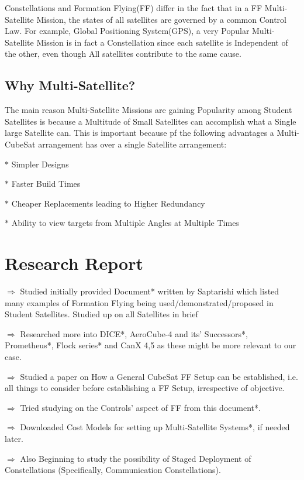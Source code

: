 \documentclass[12pt, a4paper, oneside]{book}
\newenvironment{section-points}{\begin{adjustwidth}{2cm}{2cm}}{\end{adjustwidth}}
\newenvironment{main-points}{\begin{adjustwidth}{1cm}{1cm}}{\end{adjustwidth}}
\begin{document}
\vspace{0.3cm}

Constellations and Formation Flying(FF) differ in the fact that in a FF Multi-Satellite Mission, the states of all satellites are governed by a common Control Law. For example, Global Positioning System(GPS), a very Popular Multi-Satellite Mission is in fact a Constellation since each satellite is Independent of the other, even  though All satellites contribute to the same cause.

\section{Why Multi-Satellite?}

The main reason Multi-Satellite Missions are gaining Popularity among Student Satellites is because a Multitude of Small Satellites can accomplish what a Single large Satellite can. This is important because pf the following advantages a Multi-CubeSat arrangement has over a single Satellite arrangement:
\vspace{-0.5cm}
\begin{section-points}
	\item[$\ast$] Simpler Designs
	\item[$\ast$] Faster Build Times
	\item[$\ast$] Cheaper Replacements leading to Higher Redundancy
	\item[$\ast$] Ability to view targets from Multiple Angles at Multiple Times
\end{section-points}

\chapter{Research Report}
\vspace{0.5cm}
\begin{main-points}
	\item[$\Rightarrow$] Studied initially provided Document* written by Saptarishi which listed many examples of Formation Flying being used/demonstrated/proposed in Student Satellites. Studied up on all Satellites in brief%
	\item[$\Rightarrow$] Researched more into DICE*, AeroCube-4 and its' Successors*, Prometheus*, Flock series* and CanX 4,5 as these might be more relevant to our case. 
	\item[$\Rightarrow$] Studied a paper on How a General CubeSat FF Setup can be established, i.e. all things to consider before establishing a FF Setup, irrespective of objective.%
	\item[$\Rightarrow$] Tried studying on the Controls' aspect of FF from this document*.
	\item[$\Rightarrow$] Downloaded Cost Models for setting up Multi-Satellite Systems*, if needed later.
	\item[$\Rightarrow$] Also Beginning to study the possibility of Staged Deployment of Constellations (Specifically, Communication Constellations). 
\end{main-points}
\end{document}

